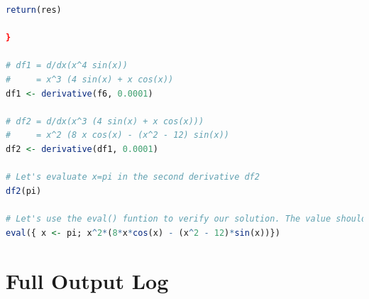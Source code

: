 \documentclass[11pt,a4paper]{article}
\begin{document}
\begin{lstlisting}[frame=trBL, language=R]
  return(res)
  
}

# df1 = d/dx(x^4 sin(x))
#     = x^3 (4 sin(x) + x cos(x))
df1 <- derivative(f6, 0.0001)

# df2 = d/dx(x^3 (4 sin(x) + x cos(x)))
#     = x^2 (8 x cos(x) - (x^2 - 12) sin(x))
df2 <- derivative(df1, 0.0001)

# Let's evaluate x=pi in the second derivative df2
df2(pi)

# Let's use the eval() funtion to verify our solution. The value should be around df2(pi)
eval({ x <- pi; x^2*(8*x*cos(x) - (x^2 - 12)*sin(x))})

\end{lstlisting}

\clearpage

\section{Full Output Log}\label{sec:fullLog}
\end{document}
